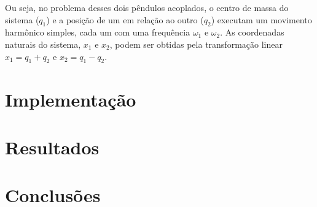 \documentclass[a4paper, 11pt]{article}
\begin{document}
	Ou seja, no problema desses dois pêndulos acoplados, o centro de massa do sistema ($q_1$) e a posição de um em relação ao outro ($q_2$) executam um movimento harmônico simples, cada um com uma frequência $\omega_1$ e $\omega_2$. As coordenadas naturais do sistema, $x_1$ e $x_2$, podem ser obtidas pela transformação linear $x_1=q_1+q_2$ e $x_2 = q_1-q_2$. 
	
\section{ Implementação }

\section{ Resultados }

\section{ Conclusões }

\newpage
\nocite{*}


\end{document}
